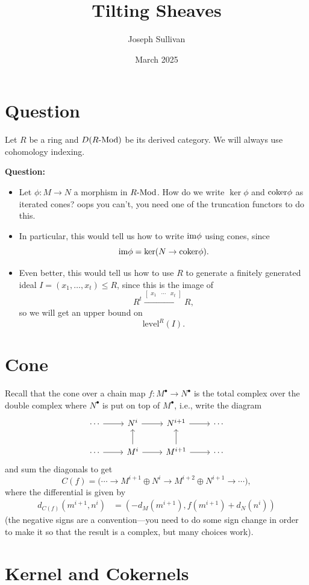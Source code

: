 \documentclass[12pt]{article}
\title{Tilting Sheaves}
\author{Joseph Sullivan}
\date{March 2025}
\begin{document}
\section{Question}

Let $R$ be a ring and $D(R\text{-}\mathrm{Mod})$ be its derived category. We will always use cohomology indexing.

\textbf{Question:}
\begin{itemize}
    \item Let $\phi:M\to N$ a morphism in $R\text{-}\mathrm{Mod}$. How do we write $\ker \phi$ and $\coker \phi$ as iterated cones? {\color{red} oops you can't, you need one of the truncation functors to do this.}
    \item In particular, this would tell us how to write $\im \phi$ using cones, since
    \[\im \phi = \ker (N \to \coker \phi).\]
    \item Even better, this would tell us how to use $R$ to generate a finitely generated ideal $I=(x_1,\dots,x_t) \leq R$, since this is the image of
    \[R^t \xrightarrow{\begin{bmatrix}
        x_1 & \cdots & x_t
    \end{bmatrix}} R,\]
    so we will get an upper bound on
    \[\mathrm{level}^R(I).\]
\end{itemize}

\section{Cone}

Recall that the cone over a chain map $f:M^\bullet \to N^\bullet$ is the total complex over the double complex where $N^\bullet$ is put on top of $M^\bullet$, i.e., write the diagram
\[\begin{tikzcd}
    \cdots \rar & N^i \rar & N^{i+1} \rar & \cdots\\
    \cdots \rar & M^i \uar \rar & M^{i+1} \uar \rar & \cdots
\end{tikzcd}\]
and sum the diagonals to get
\[C(f) = \Big(\cdots \to M^{i+1} \oplus N^{i} \to M^{i+2} \oplus N^{i+1} \to \cdots\Big),\]
where the differential is given by
\begin{align*}
    d_{C(f)}(m^{i+1},n^i) &= (-d_M(m^{i+1}), f(m^{i+1}) + d_N(n^i))
\end{align*}
(the negative signs are a convention---you need to do some sign change in order to make it so that the result is a complex, but many choices work).

\section{Kernel and Cokernels}
\end{document}
